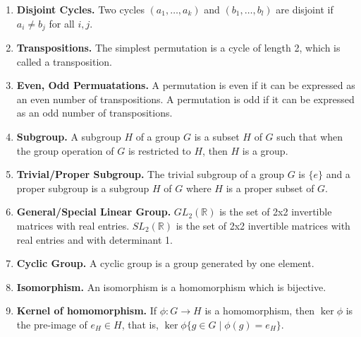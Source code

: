 \documentclass[12pt]{article}
\theoremstyle{definition}
\theoremstyle{named}
\begin{document}
\begin{enumerate}
	\item \textbf{Disjoint Cycles. } Two cycles $(a_1,\dots,a_k)$ and $(b_1,\dots,b_l)$ are disjoint if $a_i \neq b_j$ for all $i,j$. 
	\item \textbf{Transpositions. } The simplest permutation is a cycle of length 2, which is called a transposition. 
	\item \textbf{Even, Odd Permuatations. } A permutation is even if it can be expressed as an even number of transpositions. A permutation is odd if it can be expressed as an odd number of transpositions. 
	\item \textbf{Subgroup. } A subgroup $H$ of a group $G$ is a subset $H$ of $G$ such that when the group operation of $G$ is restricted to $H$, then $H$ is a group. 
	\item \textbf{Trivial/Proper Subgroup. } The trivial subgroup of a group $G$ is $\{e\}$ and a proper subgroup is a subgroup $H$ of $G$ where $H$ is a proper subset of $G$. 
	\item \textbf{General/Special Linear Group. } $GL_2(\mathbb{R})$ is the set of 2x2 invertible matrices with real entries. $SL_2(\mathbb{R})$ is the set of 2x2 invertible matrices with real entries and with determinant 1.
	\item \textbf{Cyclic Group. } A cyclic group is a group generated by one element. 
	\item \textbf{Isomorphism. } An isomorphism is a homomorphism which is bijective. 
	\item \textbf{Kernel of homomorphism. } If $\phi: G \to H$ is a homomorphism, then $\ker \phi$ is the pre-image of $e_H \in H$, that is, $\ker \phi \{g \in G \mid \phi(g)=e_H\}$. 
\end{enumerate}
\end{document}
